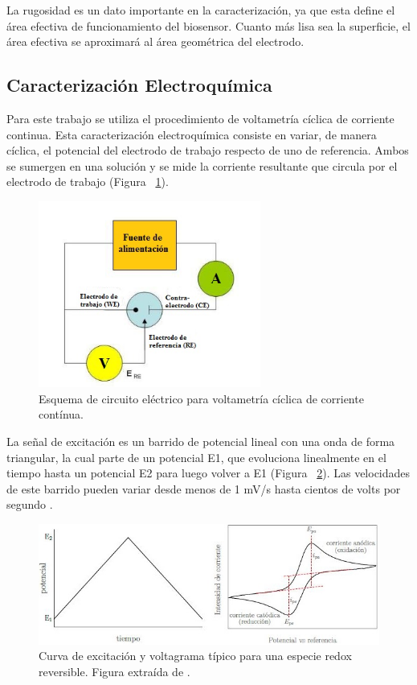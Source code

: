 La rugosidad es un dato importante en la caracterización, ya que esta define el área efectiva de funcionamiento del biosensor. Cuanto más lisa sea la superficie, el área efectiva se aproximará al área geométrica del electrodo.

\subsection{Caracterizaci\'on Electroqu\'imica}
Para este trabajo se utiliza el procedimiento de voltametría cíclica de corriente continua. Esta caracterización electroquímica consiste en variar, de manera cíclica, el potencial del electrodo de trabajo respecto de uno de referencia. Ambos se sumergen en una solución y se mide la corriente resultante que circula por el electrodo de trabajo (Figura ~\ref{fig:Figura_circuito_voltametria}). 
\begin{figure}[H]
  \centering
    \includegraphics[width=0.65\textwidth]{Figuras/Figura_circuito_voltametria}
  \caption{Esquema de circuito eléctrico para voltametría cíclica de corriente contínua.}
  \label{fig:Figura_circuito_voltametria}
\end{figure}
La señal de excitación es un barrido de potencial lineal con una onda de forma triangular, la cual parte de un potencial E1, que evoluciona linealmente en el tiempo hasta un potencial E2 para luego volver a E1 (Figura ~\ref{fig:Figura_Carac_electroquimica}). Las velocidades de este barrido pueden variar desde menos de 1 mV/s hasta cientos de volts por segundo \cite{TesisGG}.

\begin{figure}[H]
  \centering
    \includegraphics[width=1\textwidth]{Figuras/Figura_Carac_electroquimica}
  \caption{Curva de excitación y voltagrama típico para una especie redox reversible. Figura extraída de \cite{TesisGG}.}
  \label{fig:Figura_Carac_electroquimica}
\end{figure}

